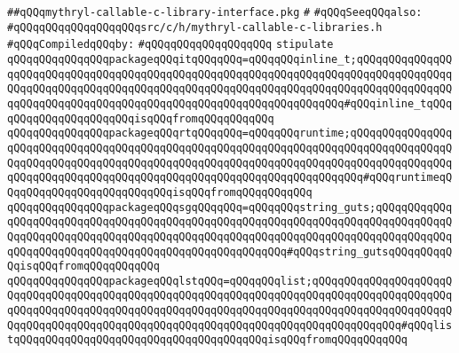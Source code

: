 \label{src/lib/std/src/unsafe/mythryl-callable-c-library-interface.pkg}
\verb|##qQQqmythryl-callable-c-library-interface.pkg|\newline
\verb|#|\newline
\verb|#qQQqSeeqQQqalso:|\newline
\verb|#qQQqqQQqqQQqqQQqqQQqsrc/c/h/mythryl-callable-c-libraries.h|\newline
\newline
\verb|#qQQqCompiledqQQqby:|\newline
\verb|#qQQqqQQqqQQqqQQqqQQq|\newline
\newline
\verb|stipulate|\newline
\verb|qQQqqQQqqQQqqQQqpackageqQQqitqQQqqQQq=qQQqqQQqinline_t;qQQqqQQqqQQqqQQqqQQqqQQqqQQqqQQqqQQqqQQqqQQqqQQqqQQqqQQqqQQqqQQqqQQqqQQqqQQqqQQqqQQqqQQqqQQqqQQqqQQqqQQqqQQqqQQqqQQqqQQqqQQqqQQqqQQqqQQqqQQqqQQqqQQqqQQqqQQqqQQqqQQqqQQqqQQqqQQqqQQqqQQqqQQqqQQqqQQqqQQqqQQqqQQq#qQQqinline_tqQQqqQQqqQQqqQQqqQQqqQQqisqQQqfromqQQqqQQqqQQq|\newline
\verb|qQQqqQQqqQQqqQQqpackageqQQqrtqQQqqQQq=qQQqqQQqruntime;qQQqqQQqqQQqqQQqqQQqqQQqqQQqqQQqqQQqqQQqqQQqqQQqqQQqqQQqqQQqqQQqqQQqqQQqqQQqqQQqqQQqqQQqqQQqqQQqqQQqqQQqqQQqqQQqqQQqqQQqqQQqqQQqqQQqqQQqqQQqqQQqqQQqqQQqqQQqqQQqqQQqqQQqqQQqqQQqqQQqqQQqqQQqqQQqqQQqqQQqqQQqqQQqqQQq#qQQqruntimeqQQqqQQqqQQqqQQqqQQqqQQqqQQqisqQQqfromqQQqqQQqqQQq|\newline
\verb|qQQqqQQqqQQqqQQqpackageqQQqsgqQQqqQQq=qQQqqQQqstring_guts;qQQqqQQqqQQqqQQqqQQqqQQqqQQqqQQqqQQqqQQqqQQqqQQqqQQqqQQqqQQqqQQqqQQqqQQqqQQqqQQqqQQqqQQqqQQqqQQqqQQqqQQqqQQqqQQqqQQqqQQqqQQqqQQqqQQqqQQqqQQqqQQqqQQqqQQqqQQqqQQqqQQqqQQqqQQqqQQqqQQqqQQqqQQqqQQqqQQq#qQQqstring_gutsqQQqqQQqqQQqisqQQqfromqQQqqQQqqQQq|\newline
\verb|qQQqqQQqqQQqqQQqpackageqQQqlstqQQq=qQQqqQQqlist;qQQqqQQqqQQqqQQqqQQqqQQqqQQqqQQqqQQqqQQqqQQqqQQqqQQqqQQqqQQqqQQqqQQqqQQqqQQqqQQqqQQqqQQqqQQqqQQqqQQqqQQqqQQqqQQqqQQqqQQqqQQqqQQqqQQqqQQqqQQqqQQqqQQqqQQqqQQqqQQqqQQqqQQqqQQqqQQqqQQqqQQqqQQqqQQqqQQqqQQqqQQqqQQqqQQqqQQqqQQqqQQq#qQQqlistqQQqqQQqqQQqqQQqqQQqqQQqqQQqqQQqqQQqqQQqisqQQqfromqQQqqQQqqQQq|\newline
